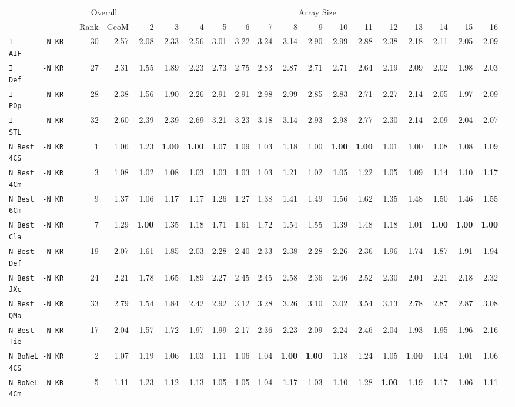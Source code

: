 \begin{tabular}{l | r @{~~} r | r@{~~}r@{~~}r@{~~}r@{~~}r@{~~}r@{~~}r@{~~}r@{~~}r@{~~}r@{~~}r@{~~}r@{~~}r@{~~}r@{~~}r@{~~}r|}
 & \multicolumn{2}{c}{Overall} & \multicolumn{15}{c}{Array Size} \\
 & Rank & GeoM & 2&3&4&5&6&7&8&9&10&11&12&13&14&15&16\\ \hline
\verb+I       -N KR AIF+ & 30 & 2.57 & 2.08&2.33&2.56&3.01&3.22&3.24&3.14&2.90&2.99&2.88&2.38&2.18&2.11&2.05&2.09\\
\verb+I       -N KR Def+ & 27 & 2.31 & 1.55&1.89&2.23&2.73&2.75&2.83&2.87&2.71&2.71&2.64&2.19&2.09&2.02&1.98&2.03\\
\verb+I       -N KR POp+ & 28 & 2.38 & 1.56&1.90&2.26&2.91&2.91&2.98&2.99&2.85&2.83&2.71&2.27&2.14&2.05&1.97&2.09\\
\verb+I       -N KR STL+ & 32 & 2.60 & 2.39&2.39&2.69&3.21&3.23&3.18&3.14&2.93&2.98&2.77&2.30&2.14&2.09&2.04&2.07\\
\verb+N Best  -N KR 4CS+ & 1 & 1.06 & 1.23&\textbf{1.00}&\textbf{1.00}&1.07&1.09&1.03&1.18&1.00&\textbf{1.00}&\textbf{1.00}&1.01&1.00&1.08&1.08&1.09\\
\verb+N Best  -N KR 4Cm+ & 3 & 1.08 & 1.02&1.08&1.03&1.03&1.03&1.03&1.21&1.02&1.05&1.22&1.05&1.09&1.14&1.10&1.17\\
\verb+N Best  -N KR 6Cm+ & 9 & 1.37 & 1.06&1.17&1.17&1.26&1.27&1.38&1.41&1.49&1.56&1.62&1.35&1.48&1.50&1.46&1.55\\
\verb+N Best  -N KR Cla+ & 7 & 1.29 & \textbf{1.00}&1.35&1.18&1.71&1.61&1.72&1.54&1.55&1.39&1.48&1.18&1.01&\textbf{1.00}&\textbf{1.00}&\textbf{1.00}\\
\verb+N Best  -N KR Def+ & 19 & 2.07 & 1.61&1.85&2.03&2.28&2.40&2.33&2.38&2.28&2.26&2.36&1.96&1.74&1.87&1.91&1.94\\
\verb+N Best  -N KR JXc+ & 24 & 2.21 & 1.78&1.65&1.89&2.27&2.45&2.45&2.58&2.36&2.46&2.52&2.30&2.04&2.21&2.18&2.32\\
\verb+N Best  -N KR QMa+ & 33 & 2.79 & 1.54&1.84&2.42&2.92&3.12&3.28&3.26&3.10&3.02&3.54&3.13&2.78&2.87&2.87&3.08\\
\verb+N Best  -N KR Tie+ & 17 & 2.04 & 1.57&1.72&1.97&1.99&2.17&2.36&2.23&2.09&2.24&2.46&2.04&1.93&1.95&1.96&2.16\\
\verb+N BoNeL -N KR 4CS+ & 2 & 1.07 & 1.19&1.06&1.03&1.11&1.06&1.04&\textbf{1.00}&\textbf{1.00}&1.18&1.24&1.05&\textbf{1.00}&1.04&1.01&1.06\\
\verb+N BoNeL -N KR 4Cm+ & 5 & 1.11 & 1.23&1.12&1.13&1.05&1.05&1.04&1.17&1.03&1.10&1.28&\textbf{1.00}&1.19&1.17&1.06&1.11\\

\end{tabular}
